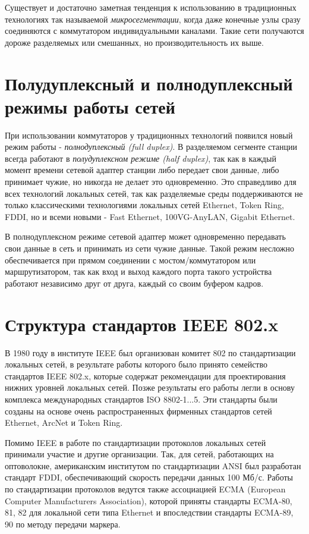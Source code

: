 Существует и достаточно заметная тенденция к использованию в традиционных технологиях так называемой \emph{микросегментации}, когда даже конечные узлы сразу соединяются с коммутатором индивидуальными каналами.
Такие сети получаются дороже разделяемых или смешанных, но производительность их выше.

\section{Полудуплексный и полнодуплексный режимы работы сетей}

При использовании коммутаторов у традиционных технологий появился новый режим работы - \emph{полнодуплексный (full duplex)}.
В разделяемом сегменте станции всегда работают в \emph{полудуплексном режиме (half duplex)},  так как в каждый момент времени сетевой адаптер станции либо передает свои данные, либо принимает чужие, но никогда не делает это одновременно.
Это справедливо для всех технологий локальных сетей, так как разделяемые среды  поддерживаются не только классическими технологиями локальных сетей Ethernet, Token Ring, FDDI, но и всеми новыми - Fast Ethernet, 100VG-AnyLAN, Gigabit Ethernet.

В полнодуплексном режиме сетевой адаптер может одновременно передавать свои данные в сеть и принимать из сети чужие данные.
Такой режим несложно обеспечивается при прямом соединении с мостом/коммутатором или маршрутизатором, так как вход и выход каждого порта такого устройства работают независимо друг от друга, каждый со своим буфером кадров.

\section{Структура стандартов IEEE 802.x}

В 1980 году в институте IEEE был организован комитет 802 по стандартизации локальных сетей, в результате работы которого было принято семейство стандартов IEEE 802.x, которые содержат рекомендации для проектирования нижних уровней локальных сетей.
Позже результаты его работы легли в основу комплекса международных стандартов ISO 8802-1...5.
Эти стандарты были созданы на основе очень распространенных фирменных стандартов сетей Ethernet, ArcNet и Token Ring.

Помимо IEEE в работе по стандартизации протоколов локальных сетей принимали участие и другие организации.
Так, для сетей, работающих на оптоволокне, американским институтом по стандартизации ANSI был разработан стандарт FDDI, обеспечивающий скорость передачи данных 100 Мб/с.
Работы по стандартизации протоколов ведутся также ассоциацией ECMA (European Computer Manufacturers Association), которой приняты стандарты ECMA-80, 81, 82 для локальной сети типа Ethernet и впоследствии стандарты ECMA-89, 90 по методу передачи маркера.

